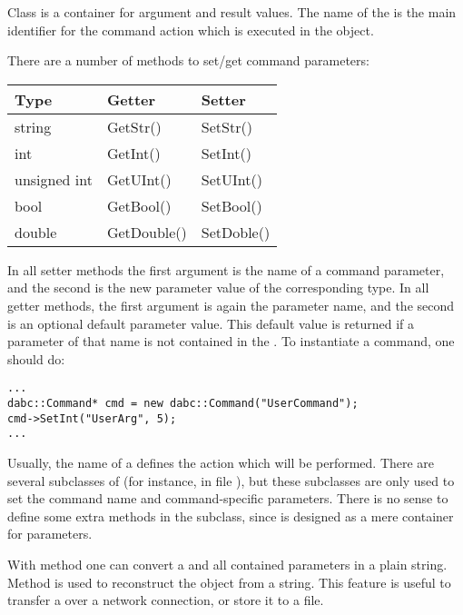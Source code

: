 Class  is a container for argument and result values.
The name of the  is the main identifier 
for the command action which is executed in the  object.

There are a number of methods to set/get command parameters:

\begin{tabular}{l|l|l}
Type &  Getter & Setter  \\
   \hline
string  & GetStr() &  SetStr() \\
int  & GetInt() &  SetInt() \\
unsigned int  & GetUInt() &  SetUInt() \\
bool  & GetBool() &  SetBool() \\
double  & GetDouble() &  SetDoble() \\
\end{tabular}

In all setter methods the first argument is the name of a command parameter,
and the second is the new parameter value
of the corresponding type. In all getter methods, the first argument is again 
the parameter name, and the second is an optional default parameter value. 
This default value is returned if a parameter of that name is 
not contained in the . 
To instantiate a command, one should do: 

\begin{small}
\begin{verbatim}
...
dabc::Command* cmd = new dabc::Command("UserCommand");
cmd->SetInt("UserArg", 5);
...
\end{verbatim}     
\end{small}
   
Usually, the name of a  defines the action which will be performed.
There are several subclasses of  (for instance, in
file ), but these subclasses are only used to set the 
command name and command-specific parameters. There is no sense to define 
some extra methods in the subclass, since  is designed 
as a mere container for parameters.

With method  one can convert a  
and all contained parameters in
a plain string. Method  is used to reconstruct 
the  object from a string. This feature is useful to transfer
a  over a network connection, or store it to a file. 



